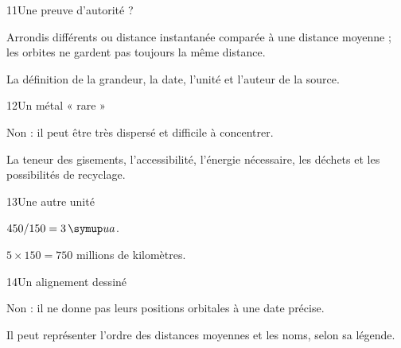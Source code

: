 \par\noindent\begin{minipage}{\linewidth}
\begin{corrige}{11}{Une preuve d’autorité ?}
\begin{questions}
\item Arrondis différents ou distance instantanée comparée à une distance moyenne ; les orbites ne gardent pas toujours la même distance.
\item La définition de la grandeur, la date, l’unité et l’auteur de la source.
\end{questions}
\end{corrige}
\end{minipage}
\par\noindent\begin{minipage}{\linewidth}
\begin{corrige}{12}{Un métal « rare »}
\begin{questions}
\item Non : il peut être très dispersé et difficile à concentrer.
\item La teneur des gisements, l’accessibilité, l’énergie nécessaire, les déchets et les possibilités de recyclage.
\end{questions}
\end{corrige}
\end{minipage}
\par\noindent\begin{minipage}{\linewidth}
\begin{corrige}{13}{Une autre unité}
\begin{questions}
\item $450/150=3\unite{ua}$.
\item $5\times150=750$ millions de kilomètres.
\end{questions}
\end{corrige}
\end{minipage}
\par\noindent\begin{minipage}{\linewidth}
\begin{corrige}{14}{Un alignement dessiné}
\begin{questions}
\item Non : il ne donne pas leurs positions orbitales à une date précise.
\item Il peut représenter l’ordre des distances moyennes et les noms, selon sa légende.
\end{questions}
\end{corrige}
\end{minipage}
